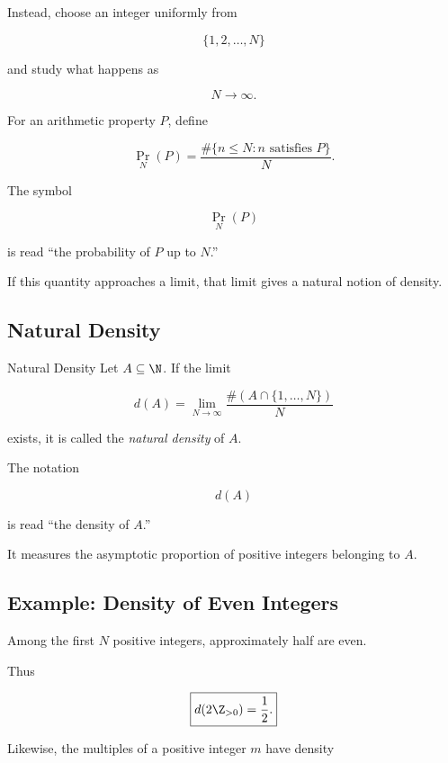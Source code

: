 Instead, choose an integer uniformly from

\[ \{1,2,\ldots,N\} \]

and study what happens as

\[ N\to\infty. \]

For an arithmetic property \(P\), define

\[ \Pr_N(P)=\frac{\#\{n\leq N:n\text{ satisfies }P\}}{N}. \]

The symbol

\[ \Pr_N(P) \]

is read ``the probability of \(P\) up to \(N\).''

If this quantity approaches a limit, that limit gives a natural notion of
density.

\subsection{Natural Density}
\label{subsec:natural-density}

\begin{definitionbox}{Natural Density}
Let \(A\subseteq\N\). If the limit

\[ d(A)=\lim_{N\to\infty}\frac{\#(A\cap\{1,\ldots,N\})}{N} \]

exists, it is called the \emph{natural density} of \(A\).
\end{definitionbox}

The notation

\[ d(A) \]

is read ``the density of \(A\).''

It measures the asymptotic proportion of positive integers belonging to
\(A\).

\subsection{Example: Density of Even Integers}
\label{subsec:density-even-integers}

Among the first \(N\) positive integers, approximately half are even.

Thus

\[ \boxed{d(2\Z_{>0})=\frac12.} \]

Likewise, the multiples of a positive integer \(m\) have density

